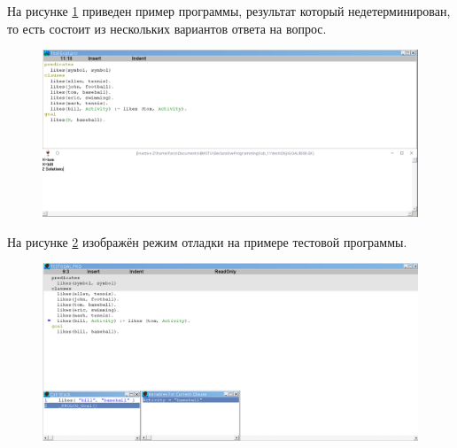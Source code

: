На рисунке \ref{img:solutions} приведен пример программы, результат который недетерминирован, то есть состоит из нескольких вариантов ответа на вопрос.
\begin{figure}[H]
    \centering
    \includegraphics[scale=.5]{imgs/solutions.png}
    \caption{}
    \label{img:solutions}
\end{figure}

На рисунке \ref{img:debug} изображён режим отладки на примере тестовой программы.
\begin{figure}[H]
    \centering
    \includegraphics[scale=.45]{imgs/debug.png}
    \caption{}
    \label{img:debug}
\end{figure}

